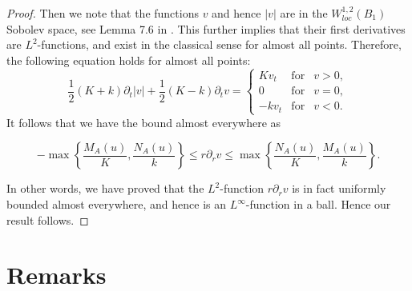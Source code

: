 \documentclass[a4paper,11pt]{amsart}
\numberwithin{equation}{section}
\def\d{\partial}
\begin{document}
\begin{proof}

Then we note that the functions $v$ and hence $|v|$ are
 in the $W^{1,2}_{loc}(B_1)$ Sobolev space, see Lemma 7.6 in \cite{GT}. 
This further implies that their first derivatives are $L^2$-functions, 
and exist in the classical sense for almost all points. 
Therefore, the following equation holds for almost all points: 
$$   \frac{1}{2} (K+k) \d_t |v| + \frac{1}{2} (K-k)\d_t  v =     
\left\{ \begin{array}{rcl}
        K v_t & \mbox{for} &  v>0, \\
         0  & \mbox{for} &  v=0, \\
         -k v_t & \mbox{for} & v<0.
                \end{array}\right. $$
It follows that we have the bound almost everywhere as 

\begin{equation}
\label{sf-0030}
-   \max \left\{ \frac{M_A(u)}{K}, \frac{N_A(u)}{k} \right\} \leq   r\d_r v \leq \max \left\{ \frac{N_A(u)}{K}, \frac{M_A(u)}{k} \right\}. 
\end{equation}

In other words, 
we have proved that the $L^2$-function $r\d_r v$ is in fact uniformly bounded 
almost everywhere, 
and hence is an $L^{\infty}$-function in a ball. 
Hence our result follows. 



\end{proof}



\section{Remarks}
\smallskip
\end{document}
